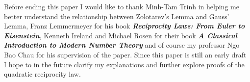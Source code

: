 \documentclass{article}
\begin{document}
\begin{spacing}{1.1}
\vspace{3mm}

Before ending this paper I would like to thank Minh-Tam Trinh in helping me better understand the relationship between Zolotarev's Lemma and Gauss' Lemma, Franz Lemmermeyer for his book \textbf{\textit{Reciprocity Laws: From Euler to Eisenstein}}, Kenneth Ireland and Michael Rosen for their book \textit{\textbf{A Classical Introduction to Modern Number Theory}} and of course my professor Ngo Bao Chau for his supervision of the paper.  Since this paper is still an early draft I hope to in the future clarify my explanations and further explore proofs of the quadratic reciprocity law.  


\end{spacing}
\end{document}
